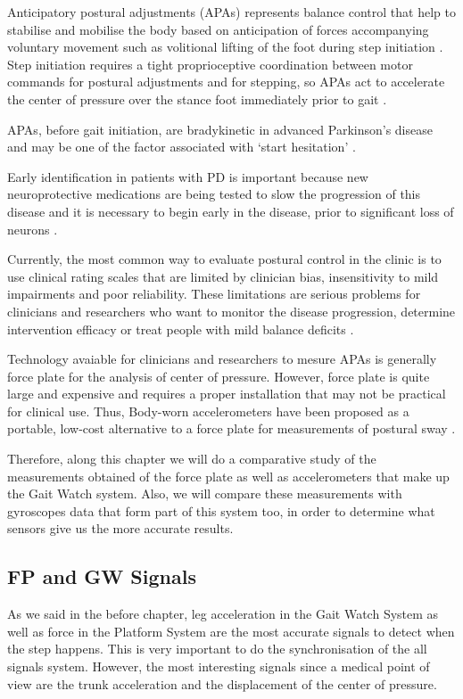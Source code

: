 Anticipatory postural adjustments (APAs)  represents balance control that help to stabilise and mobilise the body based on anticipation of forces accompanying voluntary movement such as volitional lifting of the foot during step initiation \cite{Mancini2010} . Step initiation requires a tight proprioceptive coordination between motor commands for postural adjustments and for stepping, so APAs act to accelerate the center of pressure over the stance foot immediately prior to gait \cite{Mancini2009} .

APAs, before gait initiation, are bradykinetic in advanced Parkinson’s disease and may be one of the factor associated with ‘start hesitation’ \cite{Mancini2009} .

Early identification in patients with PD is important because new neuroprotective medications are being tested to slow the progression of this disease and it is necessary to begin early in the disease, prior to significant loss of neurons \cite{Mancini2012} . 

Currently, the most common way to evaluate postural control in the clinic is to use clinical rating scales that are limited by clinician bias, insensitivity to mild impairments and poor reliability. These limitations are serious problems for clinicians and researchers who want to monitor the disease progression, determine intervention efficacy or treat people with mild balance deficits \cite{Mancini2012} .

Technology avaiable for clinicians and researchers to mesure APAs is generally force plate for the analysis of center of pressure. However, force plate is quite large and expensive and requires a proper installation that may not be practical for clinical use. Thus, Body-worn accelerometers have been proposed as a portable, low-cost alternative to a force plate for measurements of postural sway\cite{Mancini2012} .
 
Therefore, along this chapter we will do a comparative study of the measurements obtained of the force plate as well as accelerometers that make up the Gait Watch system. Also, we will compare these measurements with gyroscopes data that form part of this system too, in order to determine what sensors give us the more accurate results.

\subsection{FP and GW Signals}
As we said in the before chapter, leg acceleration in the Gait Watch System as well as force in the Platform System are the most accurate signals to detect when the step happens. This is very important to do the synchronisation of the all signals system. However, the most interesting signals since a medical point of view are the trunk acceleration and the displacement of the center of pressure.

